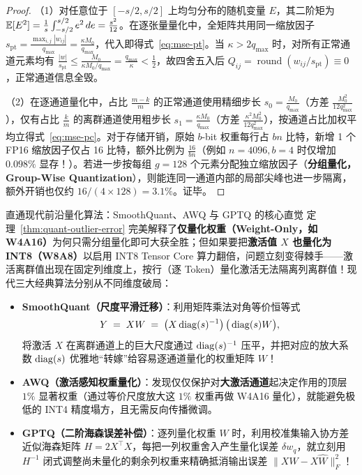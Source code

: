 \begin{proof}
（1）对任意位于 $[-s/2, s/2]$ 上均匀分布的随机变量 $E$，其二阶矩为 $\mathbb{E}[E^2] = \frac{1}{s}\int_{-s/2}^{s/2} e^2\,de = \frac{s^2}{12}$。在逐张量量化中，全矩阵共用同一缩放因子 $s_{\mathrm{pt}} = \frac{\max_{i,j}|w_{ij}|}{q_{\max}} = \frac{\kappa M_0}{q_{\max}}$，代入即得式~\eqref{eq:mse-pt}。当 $\kappa > 2 q_{\max}$ 时，对所有正常通道元素均有 $\frac{|w|}{s_{\mathrm{pt}}} \le \frac{M_0}{\kappa M_0 / q_{\max}} = \frac{q_{\max}}{\kappa} < \frac{1}{2}$，故四舍五入后 $Q_{ij} = \operatorname{round}(w_{ij}/s_{\mathrm{pt}}) \equiv 0$，正常通道信息全毁。

（2）在逐通道量化中，占比 $\frac{m-k}{m}$ 的正常通道使用精细步长 $s_0 = \frac{M_0}{q_{\max}}$（方差 $\frac{M_0^2}{12 q_{\max}^2}$），仅有占比 $\frac{k}{m}$ 的离群通道使用粗步长 $s_1 = \frac{\kappa M_0}{q_{\max}}$（方差 $\frac{\kappa^2 M_0^2}{12 q_{\max}^2}$），按通道占比加权平均立得式~\eqref{eq:mse-pc}。对于存储开销，原始 $b$-bit 权重每行占 $b n$ 比特，新增 1 个 FP16 缩放因子仅占 16 比特，额外比例为 $\frac{16}{bn}$（例如 $n = 4096, b = 4$ 时仅增加 $0.098\%$ 显存！）。若进一步按每组 $g = 128$ 个元素分配独立缩放因子（\textbf{分组量化，Group-Wise Quantization}），则能连同一通道内部的局部尖峰也进一步隔离，额外开销也仅约 $16/(4\times 128) = 3.1\%$。证毕。
\end{proof}

\begin{insightBox}{直通现代前沿量化算法：SmoothQuant、AWQ 与 GPTQ 的核心直觉}
定理~\ref{thm:quant-outlier-error} 完美解释了\textbf{仅量化权重（Weight-Only，如 W4A16）}为何只需分组量化即可大获全胜；但如果要把\textbf{激活值 $X$ 也量化为 INT8（W8A8）}以启用 INT8 Tensor Core 算力翻倍，问题立刻变得棘手——激活离群值出现在固定列维度上，按行（逐 Token）量化激活无法隔离列离群值！现代三大经典算法分别从不同维度破局：
\begin{itemize}
  \item \textbf{SmoothQuant（尺度平滑迁移）}：利用矩阵乘法对角等价恒等式
  \[
    Y \;=\; X W \;=\; \big(X \operatorname{diag}(s)^{-1}\big)\,\big(\operatorname{diag}(s) W\big),
  \]
  将激活 $X$ 在离群通道上的巨大尺度通过 $\operatorname{diag}(s)^{-1}$ 压平，并把对应的放大系数 $\operatorname{diag}(s)$ 优雅地“转嫁”给容易逐通道量化的权重矩阵 $W$！
  \item \textbf{AWQ（激活感知权重量化）}：发现仅仅保护对\textbf{大激活通道}起决定作用的顶层 $1\%$ 显著权重（通过等价尺度放大这 $1\%$ 权重再做 W4A16 量化），就能避免极低的 INT4 精度塌方，且无需反向传播微调。
  \item \textbf{GPTQ（二阶海森误差补偿）}：逐列量化权重 $W$ 时，利用校准集输入协方差近似海森矩阵 $H = 2 X^\top X$，每把一列权重舍入产生量化误差 $\delta w_q$，就立刻用 $H^{-1}$ 闭式调整尚未量化的剩余列权重来精确抵消输出误差 $\|X W - X \hat{W}\|_F^2$！
\end{itemize}
\end{insightBox}

